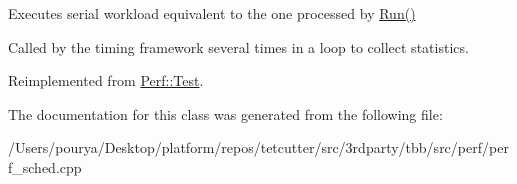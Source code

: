 Executes serial workload equivalent to the one processed by \hyperlink{classTest__PFor_a14d67cebd4bca82da7d103686392618d}{Run()} 

Called by the timing framework several times in a loop to collect statistics. 

Reimplemented from \hyperlink{classPerf_1_1Test_aa36442055c9cd1267cbdf8a0bf431239}{Perf\+::\+Test}.



The documentation for this class was generated from the following file\+:\begin{DoxyCompactItemize}
\item 
/\+Users/pourya/\+Desktop/platform/repos/tetcutter/src/3rdparty/tbb/src/perf/perf\+\_\+sched.\+cpp\end{DoxyCompactItemize}
